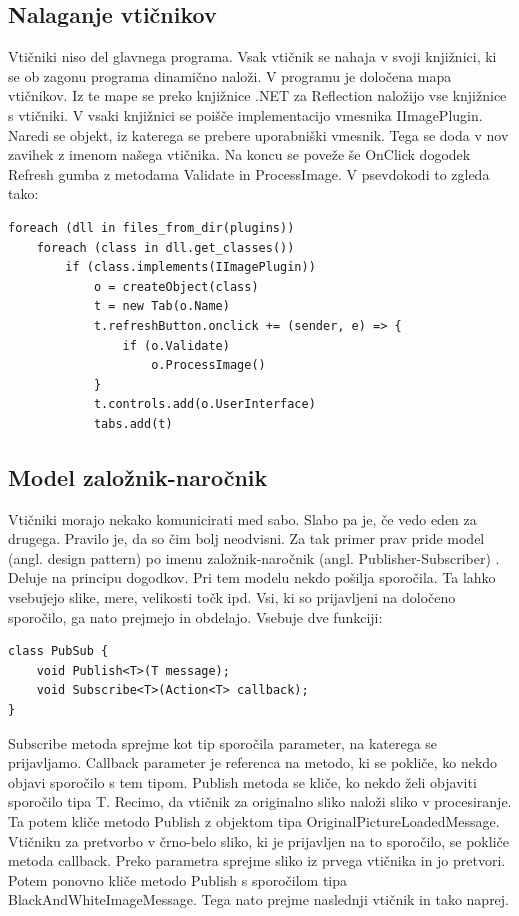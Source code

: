 \documentclass[oneside, a4paper, 12pt]{book}
\begin{document}
\subsection{Nalaganje vtičnikov}
Vtičniki niso del glavnega programa. Vsak vtičnik se nahaja v svoji knjižnici, ki se ob zagonu programa dinamično naloži. V programu je določena mapa vtičnikov. Iz te mape se preko knjižnice .NET za Reflection \cite{oreilly-cs} naložijo vse knjižnice s vtičniki. V vsaki knjižnici se poišče implementacijo vmesnika IImagePlugin. Naredi se objekt, iz katerega se prebere uporabniški vmesnik. Tega se doda v nov zavihek z imenom našega vtičnika. Na koncu se poveže še OnClick dogodek Refresh gumba z metodama Validate in ProcessImage. V psevdokodi to zgleda tako:
\begin{samepage}
\begin{verbatim}
foreach (dll in files_from_dir(plugins))
    foreach (class in dll.get_classes())
        if (class.implements(IImagePlugin))
            o = createObject(class)
            t = new Tab(o.Name)
            t.refreshButton.onclick += (sender, e) => {
                if (o.Validate)
                    o.ProcessImage()
            }
            t.controls.add(o.UserInterface)
            tabs.add(t)
\end{verbatim}
\end{samepage}

\subsection{Model založnik-naročnik}
Vtičniki morajo nekako komunicirati med sabo. Slabo pa je, če vedo eden za drugega. Pravilo je, da so čim bolj neodvisni. Za tak primer prav pride model (angl. design pattern) po imenu založnik-naročnik (angl. Publisher-Subscriber) \cite{oreilly-dp, oreilly-cs}. Deluje na principu dogodkov. Pri tem modelu nekdo pošilja sporočila. Ta lahko vsebujejo slike, mere, velikosti točk ipd. Vsi, ki so prijavljeni na določeno sporočilo, ga nato prejmejo in obdelajo. Vsebuje dve funkciji:
\begin{samepage}
\begin{verbatim}
class PubSub {
    void Publish<T>(T message);
    void Subscribe<T>(Action<T> callback);
}
\end{verbatim}
\end{samepage}
Subscribe metoda sprejme kot tip sporočila parameter, na katerega se prijavljamo. Callback parameter je referenca na metodo, ki se pokliče, ko nekdo objavi sporočilo s tem tipom. Publish metoda se kliče, ko nekdo želi objaviti sporočilo tipa T. Recimo, da vtičnik za originalno sliko naloži sliko v procesiranje. Ta potem kliče metodo Publish z objektom tipa OriginalPictureLoadedMessage. Vtičniku za pretvorbo v črno-belo sliko, ki je prijavljen na to sporočilo, se pokliče metoda callback. Preko parametra sprejme sliko iz prvega vtičnika in jo pretvori. Potem ponovno kliče metodo Publish s sporočilom tipa Black\-And\-White\-Image\-Message. Tega nato prejme naslednji vtičnik in tako naprej.
\end{document}
